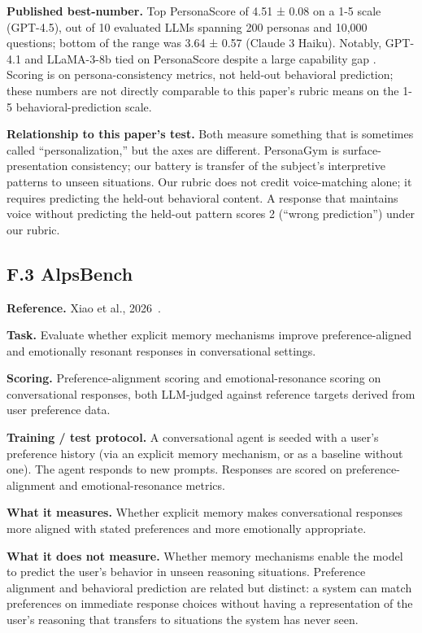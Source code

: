 \textbf{Published best-number.} Top PersonaScore of 4.51 ± 0.08 on a 1-5
scale (GPT-4.5), out of 10 evaluated LLMs spanning 200 personas and
10,000 questions; bottom of the range was 3.64 ± 0.57 (Claude 3 Haiku).
Notably, GPT-4.1 and LLaMA-3-8b tied on PersonaScore despite a large
capability gap \citep{samuel2025personagym}. Scoring is on
persona-consistency metrics, not held-out behavioral prediction; these
numbers are not directly comparable to this paper's rubric means on the
1-5 behavioral-prediction scale.

\textbf{Relationship to this paper's test.} Both measure something that
is sometimes called ``personalization,'' but the axes are different.
PersonaGym is surface-presentation consistency; our battery is transfer
of the subject's interpretive patterns to unseen situations. Our rubric
does not credit voice-matching alone; it requires predicting the
held-out behavioral content. A response that maintains voice without
predicting the held-out pattern scores 2 (``wrong prediction'') under
our rubric.

\hypertarget{f.3-alpsbench}{%
\subsection{F.3 AlpsBench}\label{f.3-alpsbench}}

\textbf{Reference.} Xiao et al., 2026~\citep{xiao2026alpsbench}.

\textbf{Task.} Evaluate whether explicit memory mechanisms improve
preference-aligned and emotionally resonant responses in conversational
settings.

\textbf{Scoring.} Preference-alignment scoring and emotional-resonance
scoring on conversational responses, both LLM-judged against reference
targets derived from user preference data.

\textbf{Training / test protocol.} A conversational agent is seeded with
a user's preference history (via an explicit memory mechanism, or as a
baseline without one). The agent responds to new prompts. Responses are
scored on preference-alignment and emotional-resonance metrics.

\textbf{What it measures.} Whether explicit memory makes conversational
responses more aligned with stated preferences and more emotionally
appropriate.

\textbf{What it does not measure.} Whether memory mechanisms enable the
model to predict the user's behavior in unseen reasoning situations.
Preference alignment and behavioral prediction are related but distinct:
a system can match preferences on immediate response choices without
having a representation of the user's reasoning that transfers to
situations the system has never seen.

